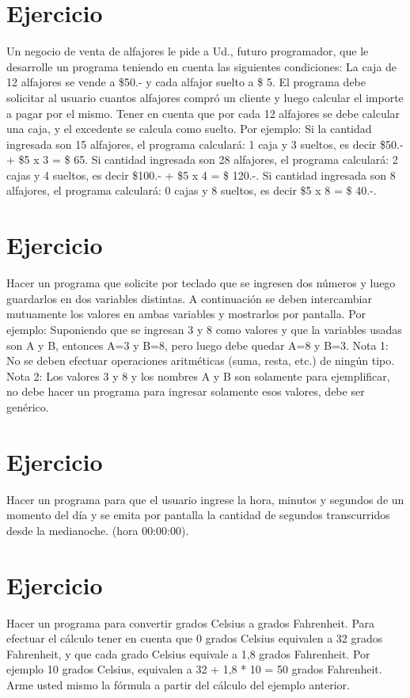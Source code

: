 \documentclass[12pt,a4paper,twoside]{article}
\begin{document}
\newpage
\section{Ejercicio }

\hspace*{1cm}Un negocio de venta de alfajores le pide a Ud., futuro programador, que le desarrolle un programa teniendo en cuenta las siguientes condiciones:
La caja de 12 alfajores se vende a \$50.- y cada alfajor suelto a \$ 5. El programa debe solicitar al usuario cuantos alfajores compró un cliente y luego calcular el importe a pagar por el mismo.
Tener en cuenta que por cada 12 alfajores se debe calcular una caja, y el excedente se calcula como suelto.
Por ejemplo: Si la cantidad ingresada son 15 alfajores, el programa calculará: 1 caja y 3
sueltos, es decir \$50.- + \$5 x 3 = \$ 65.
Si cantidad ingresada son 28 alfajores, el programa calculará: 2 cajas y 4 sueltos, es decir \$100.- + \$5 x 4 = \$ 120.-.
Si cantidad ingresada son 8 alfajores, el programa calculará: 0 cajas y 8 sueltos, es decir \$5 x 8 = \$ 40.-.

\newpage
\section{Ejercicio }

\hspace*{1cm}Hacer un programa que solicite por teclado que se ingresen dos números y luego
guardarlos en dos variables distintas. A continuación se deben intercambiar mutuamente los
valores en ambas variables y mostrarlos por pantalla.
Por ejemplo: Suponiendo que se ingresan 3 y 8 como valores y que la variables usadas son A
y B, entonces A=3 y B=8, pero luego debe quedar A=8 y B=3.
Nota 1: No se deben efectuar operaciones aritméticas (suma, resta, etc.) de ningún tipo.
Nota 2: Los valores 3 y 8 y los nombres A y B son solamente para ejemplificar, no debe hacer
un programa para ingresar solamente esos valores, debe ser genérico.

\newpage
\section{Ejercicio }

\hspace*{1cm}Hacer un programa para que el usuario ingrese la hora, minutos y segundos de un
momento del día y se emita por pantalla la cantidad de segundos transcurridos desde la
medianoche. (hora 00:00:00).

\newpage
\section{Ejercicio }

\hspace*{1cm}Hacer un programa para convertir grados Celsius a grados Fahrenheit. Para efectuar el
cálculo tener en cuenta que 0 grados Celsius equivalen a 32 grados Fahrenheit, y que cada
grado Celsius equivale a 1,8 grados Fahrenheit. Por ejemplo 10 grados Celsius, equivalen a 32
+ 1,8 * 10 = 50 grados Fahrenheit. Arme usted mismo la fórmula a partir del cálculo del
ejemplo anterior.

\newpage
\end{document}
